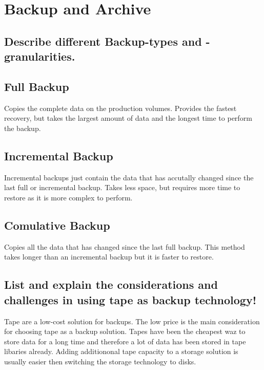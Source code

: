\section{Backup and Archive} %
\label{sec:backup_and_archive}

\subsection{Describe different Backup-types and -granularities.} %
\label{sub:describe_different_types_of_backup}
	\subsection{Full Backup} %
	\label{sub:fullbackup}
		Copies the complete data on the production volumes.
		Provides the fastest recovery,
		but takes the largest amount of data
		and the longest time to perform the backup.

	\subsection{Incremental Backup} %
	\label{sub:incremental_backup}
		Incremental backups just contain the data that has accutally changed
		since the last full or incremental backup.
		Takes less space,
		but requires more time to restore
		as it is more complex to perform.

	\subsection{Comulative Backup} %
	\label{sub:comulative_backup}
		Copies all the data that has changed since the last full backup.
		This method takes longer than an incremental backup
		but it is faster to restore.

\subsection{List and explain the considerations and challenges in using tape as backup technology!} %
\label{sub:list_and_explain_the_considerations_and_challenges_in_using_tape_as_backup_technology}
	Tape are a low-cost solution for backups.
	The low price is the main consideration for choosing tape as a backup solution.
	Tapes have been the cheapest waz to store data for a long time
	and therefore a lot of data has been stored in tape libaries already.
	Adding additiononal tape capacity to a storage solution is usually easier 
	then switching the storage technology to disks.
	
